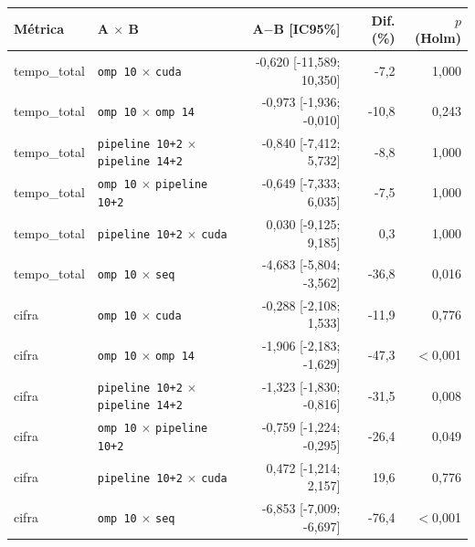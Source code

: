 \begin{tabular}{llrrr}
\hline
\textbf{M\'etrica} & \textbf{A $\times$ B} & \textbf{A$-$B [IC95\%]} & \textbf{Dif. (\%)} & \textbf{$p$ (Holm)} \\
\hline
tempo\_total & \texttt{omp 10} $\times$ \texttt{cuda} & -0,620 [-11,589; 10,350] & -7,2 & 1,000 \\
tempo\_total & \texttt{omp 10} $\times$ \texttt{omp 14} & -0,973 [-1,936; -0,010] & -10,8 & 0,243 \\
tempo\_total & \texttt{pipeline 10+2} $\times$ \texttt{pipeline 14+2} & -0,840 [-7,412; 5,732] & -8,8 & 1,000 \\
tempo\_total & \texttt{omp 10} $\times$ \texttt{pipeline 10+2} & -0,649 [-7,333; 6,035] & -7,5 & 1,000 \\
tempo\_total & \texttt{pipeline 10+2} $\times$ \texttt{cuda} & 0,030 [-9,125; 9,185] & 0,3 & 1,000 \\
tempo\_total & \texttt{omp 10} $\times$ \texttt{seq} & -4,683 [-5,804; -3,562] & -36,8 & 0,016 \\
cifra & \texttt{omp 10} $\times$ \texttt{cuda} & -0,288 [-2,108; 1,533] & -11,9 & 0,776 \\
cifra & \texttt{omp 10} $\times$ \texttt{omp 14} & -1,906 [-2,183; -1,629] & -47,3 & $<$0,001 \\
cifra & \texttt{pipeline 10+2} $\times$ \texttt{pipeline 14+2} & -1,323 [-1,830; -0,816] & -31,5 & 0,008 \\
cifra & \texttt{omp 10} $\times$ \texttt{pipeline 10+2} & -0,759 [-1,224; -0,295] & -26,4 & 0,049 \\
cifra & \texttt{pipeline 10+2} $\times$ \texttt{cuda} & 0,472 [-1,214; 2,157] & 19,6 & 0,776 \\
cifra & \texttt{omp 10} $\times$ \texttt{seq} & -6,853 [-7,009; -6,697] & -76,4 & $<$0,001 \\
\hline
\end{tabular}

